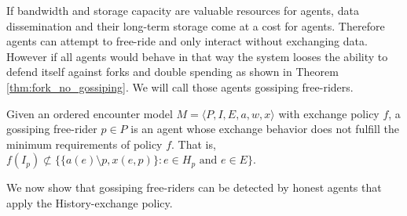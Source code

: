 If bandwidth and storage capacity are valuable resources for agents, data dissemination and their 
long-term storage come at a cost for agents. Therefore agents can attempt to free-ride and only 
interact without exchanging data. However if all agents would behave in that way the system looses 
the ability to defend itself against forks and double spending as shown in Theorem 
\ref{thm:fork_no_gossiping}. We will call those agents gossiping free-riders. 



\begin{defn}
    \label{def:gos_free-rider}
    Given an ordered encounter model $M = \langle P, I, E, a, w, x \rangle$ with exchange policy $f$, a gossiping free-rider $p \in P$ is an 
    agent whose exchange behavior does not fulfill the minimum requirements of policy $f$. That is, 
    $f(I_p) \nsubset \{ \{a(e) \setminus p, x(e, p)\} : e \in H_p \text{ and } e \in E\}$.
\end{defn}

We now show that gossiping free-riders can be detected by honest agents that apply the History-exchange
policy.

